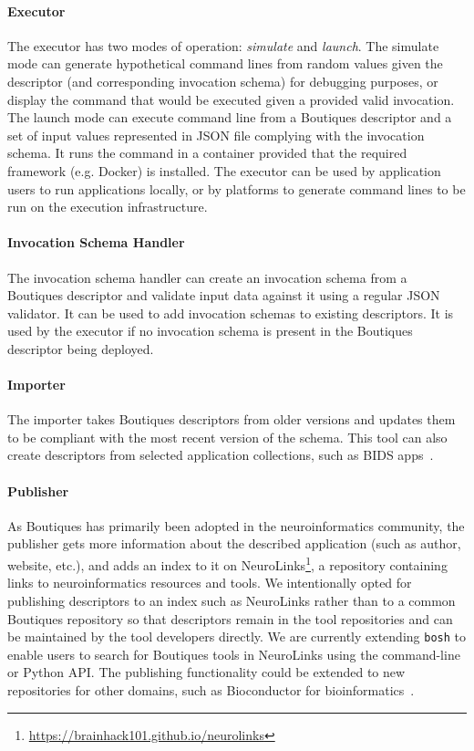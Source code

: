 \documentclass[a4paper,num-refs]{oup-contemporary}
\newcommand{\boutiques}{Boutiques\xspace}
\begin{document}
\paragraph{Executor} The executor has two modes of operation: \emph{simulate} and \emph{launch}. The simulate mode can generate hypothetical command lines from
random values given the descriptor (and corresponding invocation
schema) for debugging purposes, or display the command that would be
executed given a provided valid invocation. The launch mode can
execute command line from a \boutiques descriptor and a set of input
values represented in JSON file complying with the invocation schema.
It runs the command in a container provided that the required
framework (e.g. Docker) is installed. The executor can be used
by application users to run applications locally, or by platforms to
generate command lines to be run on the execution infrastructure.

\paragraph{Invocation Schema Handler} The invocation schema handler can create an
invocation schema from a \boutiques descriptor and validate input data
against it using a regular JSON validator. It can be used to add
invocation schemas to existing descriptors. It is used by the executor
if no invocation schema is present in the \boutiques descriptor being
deployed.

\paragraph{Importer} The importer takes \boutiques descriptors from older versions and
updates them to be compliant with the most recent version of the schema. This tool can
also create descriptors from selected application collections, such as BIDS
apps~\cite{gorgolewski2017bids}.

\paragraph{Publisher} As \boutiques has primarily been adopted in the neuroinformatics
community, the publisher gets more information about the described application (such as author,
website, etc.), and adds an index to it
on
NeuroLinks\footnote{\url{https://brainhack101.github.io/neurolinks}},
a repository containing links to neuroinformatics resources and
tools. We intentionally opted for publishing descriptors to an index
such as NeuroLinks rather than to a common \boutiques repository so
that descriptors remain in the tool repositories and can be maintained
by the tool developers directly. We are currently extending
\texttt{bosh} to enable users to search for \boutiques tools in
NeuroLinks using the command-line or Python API. The publishing
functionality could be extended to new repositories for other domains,
such as Bioconductor for
bioinformatics~\cite{gentleman2004bioconductor}.
 
\end{document}
